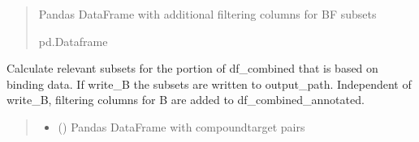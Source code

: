 \documentclass[letterpaper,10pt,english]{sphinxmanual}
\begin{document}
\begin{fulllineitems}
\begin{quote}
\begin{description}
\begin{itemize}
\end{itemize}

\sphinxAtStartPar
Pandas DataFrame with additional filtering columns for BF subsets

\sphinxAtStartPar
pd.Dataframe

\end{description}\end{quote}

\end{fulllineitems}


\begin{fulllineitems}
\label{\detokenize{write_subsets:write_subsets.write_B_to_file}}
\pysigstartsignatures
{}
\pysigstopsignatures
\sphinxAtStartPar
Calculate relevant subsets for the portion of df\_combined that is based on binding data.
If write\_B the subsets are written to output\_path.
Independent of write\_B, filtering columns for B are added to df\_combined\_annotated.
\begin{quote}\begin{description}
\begin{itemize}
\item {} 
\sphinxAtStartPar
{} () \textendash{} Pandas DataFrame with compound\sphinxhyphen{}target pairs


\end{itemize}
\end{description}
\end{quote}
\end{fulllineitems}
\end{document}
